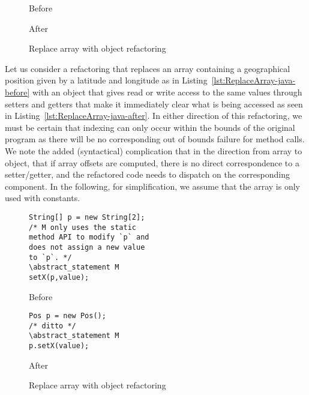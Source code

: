 \begin{figure}[tbp]
  \captionsetup{type=lstlisting}
  \centering
  \begin{sublstlisting}[h]{.45\linewidth} 
    
    \caption{Before}
    \label{lst:ReplaceArray-java-before}
  \end{sublstlisting}\hspace{1cm}
  \begin{sublstlisting}[h]{.45\linewidth}
    
    \caption{After}
    \label{lst:ReplaceArray-java-after}
  \end{sublstlisting}
  \caption{Replace array with object refactoring}
  \label{lst:ReplaceArray-java}
\end{figure}

Let us consider a refactoring that replaces an array containing a geographical position given by a latitude and longitude as in Listing~\ref{lst:ReplaceArray-java-before} with an object that gives read or write access to the same values through setters and getters that make it immediately clear what is being accessed as seen in Listing~\ref{lst:ReplaceArray-java-after}.
In either direction of this refactoring, we must be certain that indexing can only occur within the bounds of the original program as there will be no corresponding out of bounds failure for method calls.
We note the added (syntactical) complication that in the direction from array to object, that if array offsets are computed, there is no direct correspondence to a setter/getter,
and the refactored code needs to dispatch on the corresponding component.
In the following, for simplification, we assume that the array is only used with constants.



\begin{figure}[tbp]
\captionsetup{type=lstlisting}
\begin{sublstlisting}[b]{.45\linewidth} 
\begin{lstlisting}[style=smallJava]
String[] p = new String[2];
/* M only uses the static
method API to modify `p` and
does not assign a new value
to `p`. */
\abstract_statement M
setX(p,value);
\end{lstlisting}
\caption{Before}
\label{lst:ArrayBefore}
\end{sublstlisting}\hspace{1cm}
\begin{sublstlisting}[b]{.45\linewidth}
\begin{lstlisting}[style=smallJava]
Pos p = new Pos();
/* ditto */
\abstract_statement M
p.setX(value);
\end{lstlisting}
\caption{After}
\label{lst:ArrayAfter}
\end{sublstlisting}
\caption{Replace array with object refactoring}
\label{lst:ReplaceArray-REF}
\end{figure}


